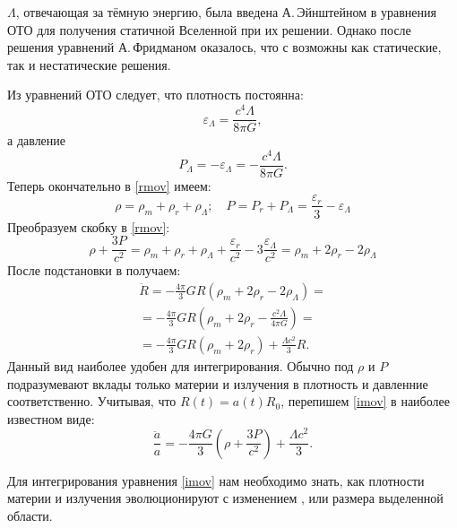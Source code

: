  $\Lambda$, отвечающая за тёмную энергию, была введена А.\,Эйнштейном в уравнения ОТО для получения статичной Вселенной при их решении. Однако после решения уравнений А.\,Фридманом оказалось, что с  возможны как статические, так и нестатические решения.

Из уравнений ОТО следует, что плотность  постоянна:
\begin{equation}
\varepsilon_{\Lambda} = \frac{c^4 \Lambda}{8 \pi G},
\end{equation}
а давление
\begin{equation}
P_{\Lambda} = -\varepsilon_{\Lambda} = -\frac{c^4 \Lambda}{8 \pi G}.
\end{equation}
Теперь окончательно в \eqref{rmov} имеем:
$$
\rho = \rho_m + \rho_r + \rho_{\Lambda}; \quad P = P_r + P_{\Lambda} = \frac{\varepsilon_r}{3} - \varepsilon_{\Lambda}
$$
Преобразуем скобку в \eqref{rmov}:
$$
\rho + \frac{3P}{c^2} = \rho_m + \rho_r + \rho_{\Lambda} + \frac{\varepsilon_r}{c^2} - 3\frac{\varepsilon_{\Lambda}}{c^2} = \rho_m + 2\rho_r - 2\rho_{\Lambda}
$$
После подстановки в  получаем:
\begin{multline}
\ddot{R} = -\frac{4 \pi}{3} G R (\rho_m + 2\rho_r - 2\rho_{\Lambda}) = \\
= -\frac{4 \pi}{3} G R \left(\rho_m + 2\rho_r - \frac{c^2 \Lambda}{4 \pi G}\right) =
\\ = -\frac{4 \pi}{3} G R \left(\rho_m + 2\rho_r\right) + \frac{\Lambda c^2}{3} R.
\label{imov}
\end{multline}
Данный вид  наиболее удобен для интегрирования. Обычно под $\rho$ и $P$ подразумевают вклады только материи и излучения в плотность и давленние соответственно. Учитывая, что $R(t) = a(t) R_0$, перепишем \eqref{imov} в наиболее известном виде:
\begin{equation}
\frac{\ddot{a}}{a} = -\frac{4 \pi G}{3} \left( \rho + \frac{3P}{c^2} \right) + \frac{\Lambda c^2}{3}.
\label{mov}
\end{equation}

Для интегрирования уравнения \eqref{imov} нам необходимо знать, как плотности материи и излучения эволюционируют с изменением , или размера выделенной области.

